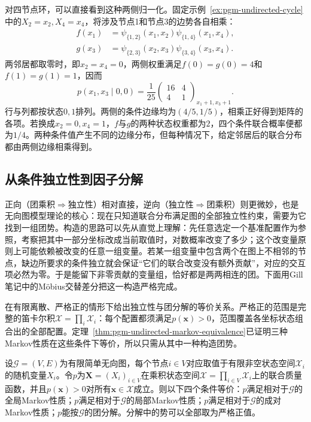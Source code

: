 对四节点环，可以直接看到这种两侧归一化。固定示例~\ref{ex:pgm-undirected-cycle}中的$X_2=x_2,X_4=x_4$，将涉及节点1和节点3的边势各自相乘：
\[
  \begin{aligned}
    f(x_1)&=\psi_{\{1,2\}}(x_1,x_2)\psi_{\{1,4\}}(x_1,x_4),\\
    g(x_3)&=\psi_{\{2,3\}}(x_2,x_3)\psi_{\{3,4\}}(x_3,x_4).
  \end{aligned}
\]
两邻居都取零时，即$x_2=x_4=0$，两侧权重满足$f(0)=g(0)=4$和$f(1)=g(1)=1$，因而
\[
  p(x_1,x_3\mid0,0)
  =\frac{1}{25}
    \begin{pmatrix}16&4\\4&1\end{pmatrix}_{x_1+1,x_3+1}.
\]
行与列都按状态$0,1$排列。两侧的条件边缘均为$(4/5,1/5)$，相乘正好得到矩阵的各项。若换成$x_2=0,x_4=1$，$f$与$g$的两种状态权重都为$2$，四个条件联合概率便都为$1/4$。两种条件值产生不同的边缘分布，但每种情况下，给定邻居后的联合分布都由两侧边缘相乘得到。

\subsection{从条件独立性到因子分解}
\label{sec:pgm-undirected-hammersley-clifford}

正向（团乘积$\Rightarrow$独立性）相对直接，逆向（独立性$\Rightarrow$团乘积）则更微妙，也是无向图模型理论的核心：现在只知道联合分布满足图的全部独立性约束，需要为它找到一组团势。构造的思路可以先从直觉上理解：先任意选定一个基准配置作为参照，考察把其中一部分坐标改成当前取值时，对数概率改变了多少；这个改变量原则上可能依赖被改变的任意一组变量。若某一组变量中包含两个在图上不相邻的节点，缺边所要求的条件独立就会保证“它们的联合改变没有额外贡献”，对应的交互项必然为零。于是能留下非零贡献的变量组，恰好都是两两相连的团。下面用Gill笔记中的Möbius交替差分把这一构造严格完成。

在有限离散、严格正的情形下给出独立性与团分解的等价关系。严格正的范围是完整的笛卡尔积$\mathcal{X}=\prod_i\mathcal{X}_i$：每个配置都须满足$p(\bm{x})>0$，范围覆盖各坐标状态组合出的全部配置。定理~\ref{thm:pgm-undirected-markov-equivalence}已证明三种Markov性质在这些条件下等价，所以只需从其中一种构造团势。

\begin{theorem}
  \label{thm:pgm-undirected-hammersley-clifford}
  设$\mathcal{G}=(V,E)$为有限简单无向图，每个节点$i\in V$对应取值于有限非空状态空间$\mathcal{X}_i$的随机变量$X_i$。令$p$为$\bm{X}=(X_i)_{i\in V}$在乘积状态空间$\mathcal{X}=\prod_{i\in V}\mathcal{X}_i$上的联合质量函数，并且$p(\bm{x})>0$对所有$\bm{x}\in\mathcal{X}$成立。则以下四个条件等价：$p$满足相对于$\mathcal{G}$的全局Markov性质；$p$满足相对于$\mathcal{G}$的局部Markov性质；$p$满足相对于$\mathcal{G}$的成对Markov性质；$p$能按$\mathcal{G}$的团分解。分解中的势可以全部取为严格正值。
\end{theorem}

